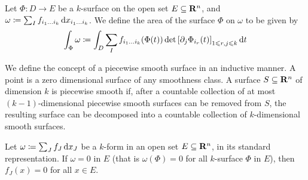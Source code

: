\begin{definition}
    \label{def:k-surface-area}
    Let \(\Phi: D \to E\) be a \(k\)-surface on the open set \(E \subseteq \mathbf{R}^n\),
    and \(\omega \coloneq \sum_I f_{i_1 \dots i_k}\, \mathrm{d} x_{i_1 \dots i_k}\). We
    define the area of the surface \(\Phi\) on \(\omega\) to be given by
    \[
        \int_{\Phi} \omega
        \coloneq \int_D \sum_I f_{i_1 \dots i_k}(\Phi(t))
        \det {\left[ \partial_j \Phi_{i_r}(t) \right]}_{1 \leqslant r, j \leqslant k}
        \, \mathrm{d} t
    \]
\end{definition}

\begin{definition}
    \label{def:piecewise-smooth-surface}
    We define the concept of a piecewise smooth surface in an inductive manner. A
    point is a zero dimensional surface of any smoothness class. A surface \(S
    \subseteq \mathbf{R}^n\) of dimension \(k\) is piecewise smooth if, after a countable
    collection of at most \((k-1)\)-dimensional piecewise smooth surfaces can be
    removed from \(S\), the resulting surface can be decomposed into a countable
    collection of \(k\)-dimensional smooth surfaces.
\end{definition}

\begin{theorem}
    \label{thm:zero-form-standard-representation}
    Let \(\omega \coloneq \sum_J f_J\, \mathrm{d} x_J\) be a \(k\)-form in an open set
    \(E \subseteq \mathbf{R}^{n}\), in its standard representation. If \(\omega = 0\) in
    \(E\) (that is \(\omega(\Phi) = 0\) for all \(k\)-surface \(\Phi\) in \(E\)),
    then \(f_J(x) = 0\) for all \(x \in E\).
\end{theorem}


